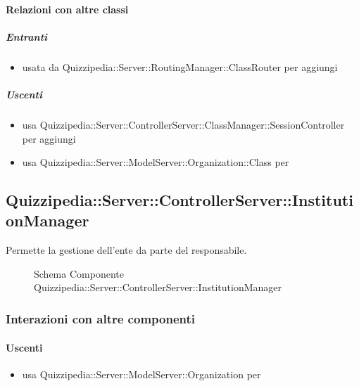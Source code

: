 \paragraph{Relazioni con altre classi}
\subparagraph{Entranti}
\begin{itemize}
\item usata da Quizzipedia::Server::RoutingManager::ClassRouter per aggiungi
\end{itemize}
\subparagraph{Uscenti}
\begin{itemize}
\item usa Quizzipedia::Server::ControllerServer::ClassManager::SessionController per aggiungi
\item usa Quizzipedia::Server::ModelServer::Organization::Class per 
\end{itemize}
\subsection{Quizzipedia::Server::ControllerServer::InstitutionManager}
Permette la gestione dell'ente da parte del responsabile.
\begin{figure}[H]
\centering
\noindent{}
\caption[Schema Componente Quizzipedia::Server::ControllerServer::InstitutionManager]{Schema Componente Quizzipedia::Server::ControllerServer::InstitutionManager}
\end{figure}
\subsubsection{Interazioni con altre componenti}
\paragraph{Uscenti}
\begin{itemize}
\item usa Quizzipedia::Server::ModelServer::Organization per 
\end{itemize}
